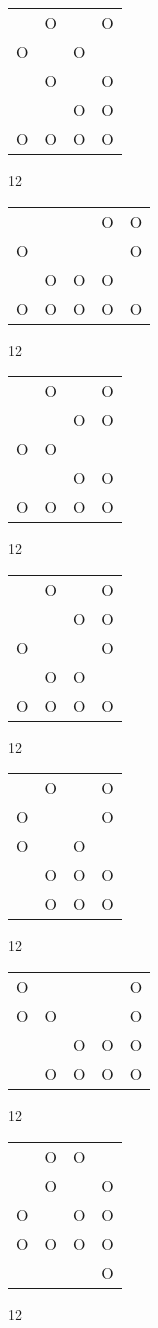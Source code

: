 \begin{tabular}{|m{0.2cm}m{0.2cm}m{0.2cm}m{0.2cm}|}\hline
 &O& &O\\
O& &O& \\
 &O& &O\\
 & &O&O\\
O&O&O&O\\
\hline\end{tabular}12
\begin{tabular}{|m{0.2cm}m{0.2cm}m{0.2cm}m{0.2cm}m{0.2cm}|}\hline
 & & &O&O\\
O& & & &O\\
 &O&O&O& \\
O&O&O&O&O\\
\hline\end{tabular}12
\begin{tabular}{|m{0.2cm}m{0.2cm}m{0.2cm}m{0.2cm}|}\hline
 &O& &O\\
 & &O&O\\
O&O& & \\
 & &O&O\\
O&O&O&O\\
\hline\end{tabular}12
\begin{tabular}{|m{0.2cm}m{0.2cm}m{0.2cm}m{0.2cm}|}\hline
 &O& &O\\
 & &O&O\\
O& & &O\\
 &O&O& \\
O&O&O&O\\
\hline\end{tabular}12
\begin{tabular}{|m{0.2cm}m{0.2cm}m{0.2cm}m{0.2cm}|}\hline
 &O& &O\\
O& & &O\\
O& &O& \\
 &O&O&O\\
 &O&O&O\\
\hline\end{tabular}12
\begin{tabular}{|m{0.2cm}m{0.2cm}m{0.2cm}m{0.2cm}m{0.2cm}|}\hline
O& & & &O\\
O&O& & &O\\
 & &O&O&O\\
 &O&O&O&O\\
\hline\end{tabular}12
\begin{tabular}{|m{0.2cm}m{0.2cm}m{0.2cm}m{0.2cm}|}\hline
 &O&O& \\
 &O& &O\\
O& &O&O\\
O&O&O&O\\
 & & &O\\
\hline\end{tabular}12
